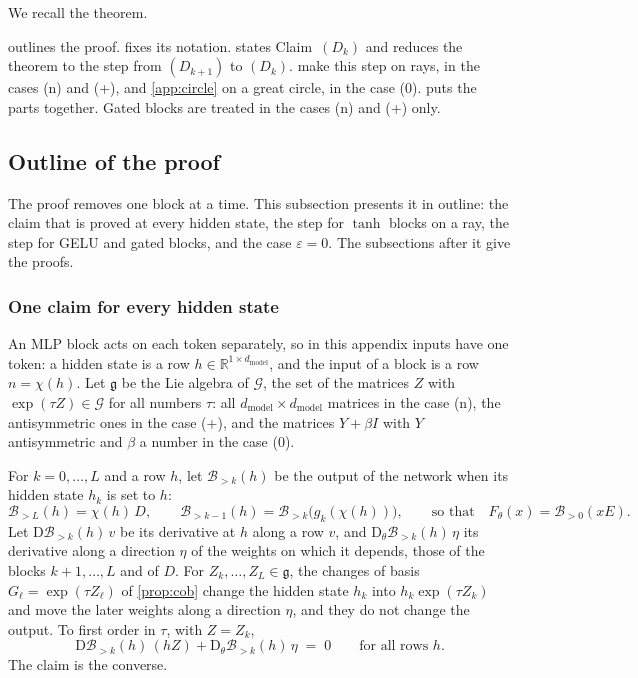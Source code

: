 \documentclass[10pt]{article}
\theoremstyle{definition}
\theoremstyle{remark}
\newcommand{\R}{\mathbb{R}}
\newcommand{\dm}{d_{\mathrm{model}}}
\newcommand{\Der}{\mathrm{D}}
\newcommand{\G}{\mathcal{G}}
\begin{document}
We recall the theorem.

\thmSkipless*

 outlines the proof.  fixes its notation.  states Claim~$(D_k)$ and reduces the theorem to the step from $(D_{k+1})$ to $(D_k)$.  make this step on rays, in the cases (n) and (+), and \cref{app:circle} on a great circle, in the case (0).  puts the parts together. Gated blocks are treated in the cases (n) and (+) only.

\subsection{Outline of the proof}\label{app:outline}

The proof removes one block at a time. This subsection presents it in outline: the claim that is proved at every hidden state, the step for $\tanh$ blocks on a ray, the step for GELU and gated blocks, and the case $\varepsilon = 0$. The subsections after it give the proofs.

\subsubsection*{One claim for every hidden state}

An MLP block acts on each token separately, so in this appendix inputs have one token: a hidden state is a row $h \in \R^{1\times\dm}$, and the input of a block is a row $n = \chi(h)$. Let $\mathfrak g$ be the Lie algebra of $\G$, the set of the matrices $Z$ with $\exp(\tau Z) \in \G$ for all numbers $\tau$: all $\dm\times\dm$ matrices in the case (n), the antisymmetric ones in the case (+), and the matrices $Y + \beta I$ with $Y$ antisymmetric and $\beta$ a number in the case (0).

For $k = 0, \dots, L$ and a row $h$, let $\mathcal B_{>k}(h)$ be the output of the network when its hidden state $h_k$ is set to $h$:
\[
\mathcal B_{>L}(h) = \chi(h)\,D, \qquad \mathcal B_{>k-1}(h) = \mathcal B_{>k}\big(g_k(\chi(h))\big), \qquad\text{so that}\quad F_\theta(x) = \mathcal B_{>0}(xE).
\]
Let $\Der\mathcal B_{>k}(h)\,v$ be its derivative at $h$ along a row $v$, and $\Der_\theta\mathcal B_{>k}(h)\,\eta$ its derivative along a direction $\eta$ of the weights on which it depends, those of the blocks $k+1, \dots, L$ and of $D$. For $Z_k, \dots, Z_L \in \mathfrak g$, the changes of basis $G_\ell = \exp(\tau Z_\ell)$ of \cref{prop:cob} change the hidden state $h_k$ into $h_k\exp(\tau Z_k)$ and move the later weights along a direction $\eta$, and they do not change the output. To first order in $\tau$, with $Z = Z_k$,
\begin{equation}\label{eq:mainD}
\Der\mathcal B_{>k}(h)\,(hZ) + \Der_\theta\mathcal B_{>k}(h)\,\eta \;=\; 0 \qquad\text{for all rows } h .
\end{equation}
The claim is the converse.
\end{document}
